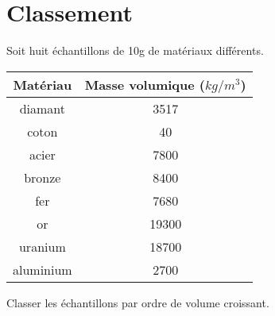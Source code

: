 \section{Classement}

Soit huit échantillons de 10g de matériaux différents.

\begin{center}
	\begin{tabular}{|c|c|}
		\hline
		Matériau  & Masse volumique ($kg/m^3$) \\ \hline
		diamant   & \num{3517}                 \\ \hline
		coton     & \num{40}                   \\ \hline
		acier     & \num{7800}                 \\ \hline
		bronze    & \num{8400}                 \\ \hline
		fer       & \num{7680}                 \\ \hline
		or        & \num{19300}                \\ \hline
		uranium   & \num{18700}                \\ \hline
		aluminium & \num{2700}                 \\ \hline
	\end{tabular}
\end{center}

\begin{questions}
	\question Classer les échantillons par ordre de volume croissant.
	
\end{questions}